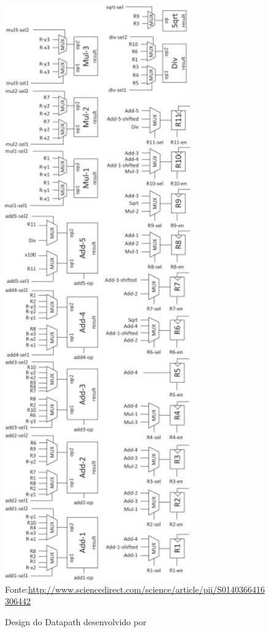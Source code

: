\begin{figure}[H]
	\centering
		\caption{Design do Datapath desenvolvido por \cite{HOQUE201748}}
	\includegraphics[width=8cm]{figures/dp.jpg}\\
{Fonte:\url{http://www.sciencedirect.com/science/article/pii/S0140366416306442}}
	\label{extend}
\end{figure}



